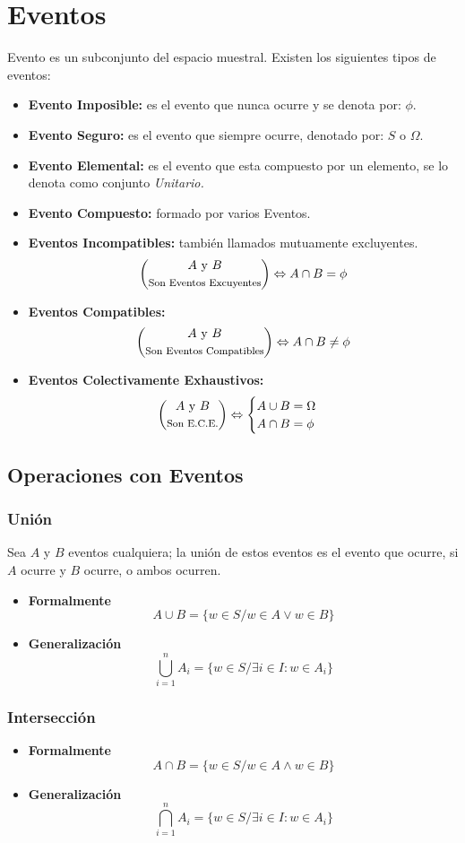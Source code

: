 \section{Eventos}
Evento es un subconjunto del espacio muestral. Existen los siguientes tipos de eventos:
\begin{itemize}
\item \textbf{Evento Imposible:} es el evento que nunca ocurre y se denota por: $\phi$.
\item \textbf{Evento Seguro:} es el evento que siempre ocurre, denotado por: $S$ o $\Omega$.
\item \textbf{Evento Elemental:} es el evento que esta compuesto por un elemento, se lo denota como conjunto \textit{Unitario.}
\item \textbf{Evento Compuesto:} formado por varios Eventos.
\item \textbf{Eventos Incompatibles:} también llamados mutuamente excluyentes.
$$\binom{\textrm{$A$ y $B$}}{\textrm{{\footnotesize Son Eventos Excuyentes}}}\Leftrightarrow A\cap B= \phi$$
\item \textbf{Eventos Compatibles:}
$$\binom{\textrm{$A$ y $B$}}{\textrm{{\footnotesize Son Eventos Compatibles}}}\Leftrightarrow A\cap B \neq \phi$$
\item \textbf{Eventos Colectivamente Exhaustivos:}
$$\binom{\textrm{$A$ y $B$}}{\textrm{{\footnotesize Son E.C.E.}}}\Leftrightarrow 
\begin{cases}
A\cup B = \Omega\\
A\cap B = \phi
\end{cases}$$
\end{itemize}
\subsection{Operaciones con Eventos}
\subsubsection{Unión}
Sea $A$ y $B$ eventos cualquiera; la unión de estos eventos es el evento que ocurre, si $A$ ocurre y $B$ ocurre, o ambos ocurren.
\begin{itemize}
\item \textbf{Formalmente}
$$A\cup B = \{ w\in S / w\in A \vee w\in B\}$$
\item \textbf{Generalización}
$$ \bigcup\limits_{i=1}^{n} A_i = \{w\in S/ \exists i\in I : w\in A_i \}$$
\end{itemize}
\subsubsection{Intersección}
\begin{itemize}
\item \textbf{Formalmente}
$$A\cap B = \{ w\in S / w\in A \wedge w\in B\}$$
\item \textbf{Generalización}
$$ \bigcap\limits_{i=1}^{n} A_i  = \{w\in S/ \exists i\in I : w\in A_i \}$$
\end{itemize}
